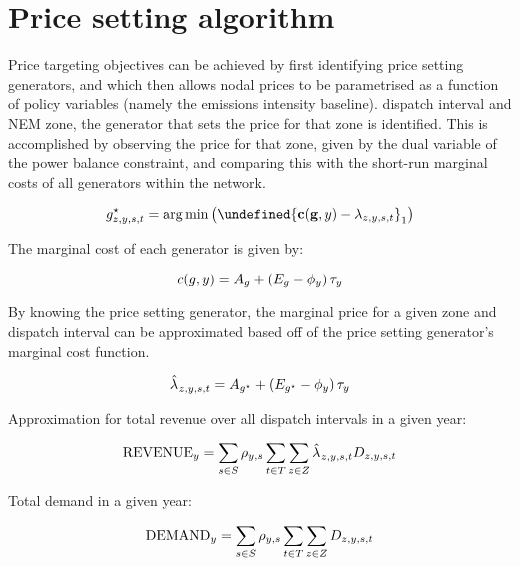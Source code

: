 \documentclass{article}
\let\norm\undefined %
\DeclarePairedDelimiter\norm{\lVert}{\rVert}
\begin{document}
\section{Price setting algorithm}
Price targeting objectives can be achieved by first identifying price setting generators, and which then allows nodal prices to be parametrised as a function of policy variables (namely the emissions intensity baseline). dispatch interval and NEM zone, the generator that sets the price for that zone is identified. This is accomplished by observing the price for that zone, given by the dual variable of the power balance constraint, and comparing this with the short-run marginal costs of all generators within the network. 

\begin{equation}
	\iGenerator^{\star}_{\iZone,\iYear,\iScenario,\iInterval} = \arg\min \left(\norm{\mathbf{c}(\mathbf{\iGenerator}, \iYear) - \dPowerBalance}_{1}\right)
\end{equation}

The marginal cost of each generator is given by:

\begin{equation}
	c(\iGenerator, \iYear) = A_{\iGenerator} + \left(\cEmissionsIntensity - \vBaseline\right) \vPermitPrice
\end{equation}

By knowing the price setting generator, the marginal price for a given zone and dispatch interval can be approximated based off of the price setting generator's marginal cost function.

\begin{equation}
	\hat{\dPowerBalance[]}_{\iZone,\iYear,\iScenario,\iInterval} = A_{\iGenerator^{\star}} + \left(\cEmissionsIntensity[\iGenerator^{\star}] - \vBaseline\right) \vPermitPrice
\end{equation}

Approximation for total revenue over all dispatch intervals in a given year:

\begin{equation}
	\mathrm{REVENUE}_{\iYear} = \sum\limits_{\iScenario \in \sScenarios} \cScenarioDuration \sum\limits_{\iInterval \in \sIntervals}\sum\limits_{\iZone \in \sZones} \hat{\dPowerBalance[]}_{\iZone,\iYear,\iScenario,\iInterval} \cDemand
\end{equation}

Total demand in a given year:

\begin{equation}
\mathrm{DEMAND}_{\iYear} = \sum\limits_{\iScenario \in \sScenarios} \cScenarioDuration \sum\limits_{\iInterval \in \sIntervals}\sum\limits_{\iZone \in \sZones} \cDemand
\end{equation}
\end{document}
